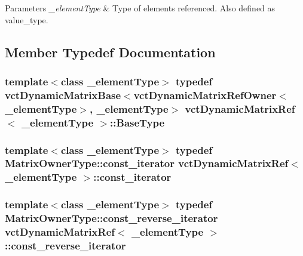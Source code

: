 \begin{DoxyParams}{Parameters}
{\em \+\_\+element\+Type} & Type of elements referenced. Also defined as {\ttfamily value\+\_\+type}. \\
\hline
\end{DoxyParams}


\subsection{Member Typedef Documentation}
\hypertarget{classvct_dynamic_matrix_ref_a043cfda592e3e7fbca034c09aed3438b}{}
\subsubsection[{Base\+Type}]{\setlength{\rightskip}{0pt plus 5cm}template$<$class \+\_\+element\+Type$>$ typedef {\bf vct\+Dynamic\+Matrix\+Base}$<${\bf vct\+Dynamic\+Matrix\+Ref\+Owner}$<$\+\_\+element\+Type$>$, \+\_\+element\+Type$>$ {\bf vct\+Dynamic\+Matrix\+Ref}$<$ \+\_\+element\+Type $>$\+::{\bf Base\+Type}}\label{classvct_dynamic_matrix_ref_a043cfda592e3e7fbca034c09aed3438b}
\hypertarget{classvct_dynamic_matrix_ref_a6a0340b4b42746edc27c8220cf44afd8}{}
\subsubsection[{const\+\_\+iterator}]{\setlength{\rightskip}{0pt plus 5cm}template$<$class \+\_\+element\+Type$>$ typedef {\bf Matrix\+Owner\+Type\+::const\+\_\+iterator} {\bf vct\+Dynamic\+Matrix\+Ref}$<$ \+\_\+element\+Type $>$\+::{\bf const\+\_\+iterator}}\label{classvct_dynamic_matrix_ref_a6a0340b4b42746edc27c8220cf44afd8}
\hypertarget{classvct_dynamic_matrix_ref_a6b38953e6bef46b68d3336829873f48e}{}
\subsubsection[{const\+\_\+reverse\+\_\+iterator}]{\setlength{\rightskip}{0pt plus 5cm}template$<$class \+\_\+element\+Type$>$ typedef {\bf Matrix\+Owner\+Type\+::const\+\_\+reverse\+\_\+iterator} {\bf vct\+Dynamic\+Matrix\+Ref}$<$ \+\_\+element\+Type $>$\+::{\bf const\+\_\+reverse\+\_\+iterator}}\label{classvct_dynamic_matrix_ref_a6b38953e6bef46b68d3336829873f48e}
\hypertarget{classvct_dynamic_matrix_ref_a96cb0ad0104a135e19f1e39567a16ef2}{}
